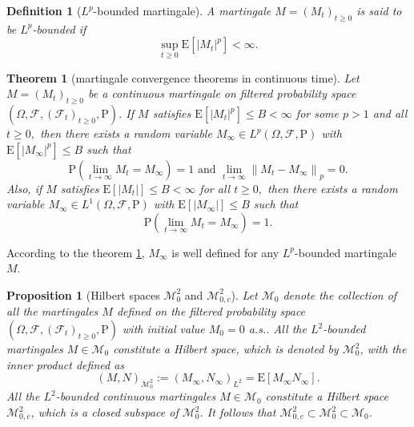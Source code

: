 \documentclass{article}
\newtheorem{definition}{Definition}[section]
\newtheorem{proposition}{Proposition}[section]
\newtheorem{theorem}{Theorem}[section]
\theoremstyle{nonumberplain}
\begin{document}
\begin{definition}[$L^p$-bounded martingale]
	A martingale $M=(M_t)_{t\ge0}$ is said to be $L^p$-\emph{bounded} if 
	$$
	\sup _{t \geq 0} \mathrm{E}\left[|M_{t}|^{p}\right]<\infty.
	$$
\end{definition}


\begin{theorem}[martingale convergence theorems in continuous time]\label{martingale convergence}
Let $M=(M_{t})_{t\ge0}$ be a continuous martingale on filtered probability space $(\Omega,\mathcal{F},(\mathcal{F}_{t})_{t\ge0},\mathrm{P})$. If $M$ satisfies $\mathrm{E}\left[\left|M_{t}\right|^{p}\right] \leq B<\infty$ for some $p>1$ and all $t \geq 0,$ then there exists a random variable $M_{\infty}\in L^p(\Omega,\mathcal{F},\mathrm{P})$ with $\mathrm{E}\left[\left|M_{\infty}\right|^p\right] \leq B$ such that
\[
\mathrm{P}\left(\lim _{t \rightarrow \infty} M_{t}=M_{\infty}\right)=1 \text { and } \lim _{t \rightarrow \infty}\left\|M_{t}-M_{\infty}\right\|_{p}=0.
\]
Also, if $M$ satisfies $\mathrm{E}\left[\left|M_{t}\right|\right]\le B<\infty$ for all $t \ge 0,$ then there exists a random variable $M_{\infty}\in L^1(\Omega,\mathcal{F},\mathrm{P})$ with $\mathrm{E}\left[\left|M_{\infty}\right|\right] \leq B$ such that
\[
\mathrm{P}\left(\lim _{t \rightarrow \infty} M_{t}=M_{\infty}\right)=1.
\]
\end{theorem}
According to the theorem \ref{martingale convergence}, $M_{\infty}$ is well defined for any $L^p$-bounded martingale $M$. 

\begin{proposition}[Hilbert spaces $\mathscr{M}^2_0$ and $\mathscr{M}^2_{0,c}$]
Let $\mathscr{M}_0$ denote the collection of all the martingales $M$ defined on the filtered probability space $(\Omega,\mathcal{F},(\mathcal{F}_{t})_{t\ge0},\mathrm{P})$ with initial value $M_0=0$ a.s.. All the $L^2$-bounded martingales $M\in\mathscr{M}_0$ constitute a Hilbert space, which is denoted by $\mathscr{M}^2_{0}$, with the inner product defined as 
$$
 (M, N)_{\mathscr{M}^2_{0}}:=\left( M_{\infty}, N_{\infty}\right)_{L^{2}}=\mathrm{E}\left[M_{\infty} N_{\infty}\right].
$$
All the $L^2$-bounded continuous martingales $M\in\mathscr{M}_0$ constitute a Hilbert space $\mathscr{M}^2_{0,c}$, which is a closed subspace of $\mathscr{M}^2_{0}$. It follows that $\mathscr{M}^2_{0,c}\subset\mathscr{M}^2_{0}\subset\mathscr{M}_{0}$.
\end{proposition}
\end{document}
